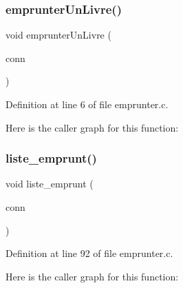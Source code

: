 \subsubsection{emprunter\+Un\+Livre()}
{\footnotesize\ttfamily void emprunter\+Un\+Livre (\begin{DoxyParamCaption}\item[{M\+Y\+S\+QL $\ast$}]{conn }\end{DoxyParamCaption})}



Definition at line 6 of file emprunter.\+c.

Here is the caller graph for this function\+:
\mbox{\label{emprunter_8c_a7b615bb15707628327462e2deaf4f2ce}} 
\subsubsection{liste\+\_\+emprunt()}
{\footnotesize\ttfamily void liste\+\_\+emprunt (\begin{DoxyParamCaption}\item[{M\+Y\+S\+QL $\ast$}]{conn }\end{DoxyParamCaption})}



Definition at line 92 of file emprunter.\+c.

Here is the caller graph for this function\+:
